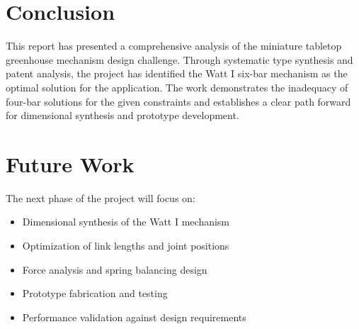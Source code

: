 \documentclass[12pt]{article}
\begin{document}
\section{Conclusion}
\label{sec:conclusion}

This report has presented a comprehensive analysis of the miniature tabletop greenhouse mechanism design challenge. Through systematic type synthesis and patent analysis, the project has identified the Watt I six-bar mechanism as the optimal solution for the application. The work demonstrates the inadequacy of four-bar solutions for the given constraints and establishes a clear path forward for dimensional synthesis and prototype development.

\section{Future Work}
\label{sec:future_work}

The next phase of the project will focus on:

\begin{itemize}
    \item Dimensional synthesis of the Watt I mechanism
    \item Optimization of link lengths and joint positions
    \item Force analysis and spring balancing design
    \item Prototype fabrication and testing
    \item Performance validation against design requirements
\end{itemize}



\end{document}
